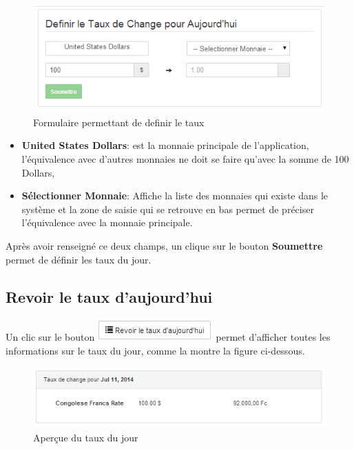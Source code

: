 \documentclass[12pt,a4paper]{report}
\begin{document}
\begin{figure}[h]
\begin{center}
\includegraphics[width=12cm]{pic/DefinirTaux.png}
\end{center}
\caption{Formulaire permettant de definir le taux}
\label{Formulaire permettant de definir le taux}
\end{figure}
\begin{itemize}
\item \textbf{United States Dollars}: est la monnaie principale de l'application, l'équivalence avec d'autres monnaies ne doit se faire qu'avec la somme de 100 Dollars,
\item \textbf{Sélectionner Monnaie}: Affiche la liste des monnaies qui existe dans le système et la zone de saisie qui se retrouve en bas permet de préciser l'équivalence avec la monnaie principale.
\end{itemize}
Après avoir renseigné ce deux champs, un clique sur le bouton \textbf{Soumettre} permet de définir les taux du jour.

\subsection{Revoir le taux d'aujourd'hui}
Un clic sur le bouton \includegraphics[scale=0.7]{pic/RevoirTaux.png} permet d'afficher toutes les informations sur le taux du jour, comme la montre la figure ci-dessous.
\begin{figure}[h]
\begin{center}
\includegraphics[width=12cm]{pic/ShowRate.png}
\end{center}
\caption{Aperçue du taux du jour}
\label{Aperçue du taux du jour}
\end{figure}
\newpage
\end{document}
